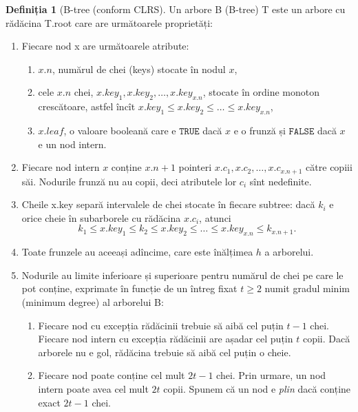 \documentclass{article}
\theoremstyle{definition}
\newtheorem{defn}{Definiția}
\begin{document}
\begin{defn}[B-tree (conform CLRS]
	Un arbore B (B-tree) T este un arbore cu
	rădăcina T.root care are următoarele proprietăți:
	\begin{enumerate}[label=\arabic*.]
		\item Fiecare nod x are următoarele atribute:
		      \begin{enumerate}[label=\alph*.]
			      \item $x.n$, numărul de chei (keys) stocate în nodul $x$,
			      \item cele $x.n$ chei, $x.key_1, x.key_2, \dots, x.key_{x.n}$, stocate în ordine
			            monoton crescătoare, astfel încît
			            $x.key_1 \leq x.key_2 \leq \dots \leq x.key_{x.n}$,
			      \item $x.\mathit{leaf}$, o valoare booleană care e $\mathtt{TRUE}$ dacă $x$ e o frunză și $\mathtt{FALSE}$ dacă $x$
			            e un nod intern.
		      \end{enumerate}

		\item Fiecare nod intern $x$ conține $x.n + 1$ pointeri $x.c_1, x.c_2, \dots, x.c_{x.n + 1}$ către copiii săi. Nodurile frunză nu au copii, deci
		      atributele lor $c_i$ sînt nedefinite.

		\item Cheile x.key separă intervalele de chei stocate în fiecare
		      subtree: dacă $k_i$ e orice cheie în subarborele cu rădăcina $x.c_i$,
		      atunci
		      \begin{equation*}
			      k_1 \leq x.key_1 \leq k_2 \leq x.key_2 \leq \dots \leq x.key_{x.n} \leq k_{x.n + 1} \text{.}
		      \end{equation*}

		\item Toate frunzele au aceeași adîncime, care este înălțimea $h$ a arborelui.

		\item Nodurile au limite inferioare și superioare pentru numărul de chei
		      pe care le pot conține, exprimate în funcție de
		      un întreg fixat $t \geq 2$ numit gradul minim
		      (minimum degree) al arborelui B:
		      \begin{enumerate}[label=\alph*.]
			      \item Fiecare nod cu excepția rădăcinii
			            trebuie să aibă cel puțin $t - 1$ chei.
			            Fiecare nod intern cu excepția rădăcinii are
			            așadar cel puțin $t$ copii. Dacă arborele nu
			            e gol, rădăcina trebuie să aibă cel puțin o
			            cheie.
			      \item Fiecare nod poate conține cel mult
			            $2t- 1$ chei. Prin urmare, un nod intern
			            poate avea cel mult $2t$ copii. Spunem că un
			            nod e \emph{plin} dacă conține exact $2t -
				            1$ chei.
		      \end{enumerate}
	\end{enumerate}
\end{defn}
\end{document}
